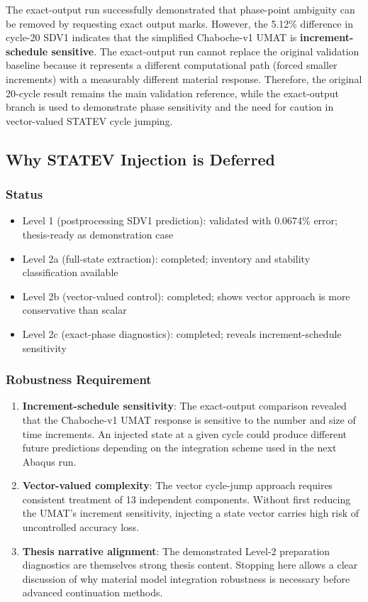 The exact-output run successfully demonstrated that phase-point ambiguity can be removed by requesting exact output marks. However, the 5.12\% difference in cycle-20 SDV1 indicates that the simplified Chaboche-v1 UMAT is \textbf{increment-schedule sensitive}. The exact-output run cannot replace the original validation baseline because it represents a different computational path (forced smaller increments) with a measurably different material response. Therefore, the original 20-cycle result remains the main validation reference, while the exact-output branch is used to demonstrate phase sensitivity and the need for caution in vector-valued STATEV cycle jumping.

\subsection{Why STATEV Injection is Deferred}

\subsubsection{Status}
\begin{itemize}
  \item Level 1 (postprocessing SDV1 prediction): validated with 0.0674\% error; thesis-ready as demonstration case
  \item Level 2a (full-state extraction): completed; inventory and stability classification available
  \item Level 2b (vector-valued control): completed; shows vector approach is more conservative than scalar
  \item Level 2c (exact-phase diagnostics): completed; reveals increment-schedule sensitivity
\end{itemize}

\subsubsection{Robustness Requirement}

\begin{enumerate}
  \item \textbf{Increment-schedule sensitivity}: The exact-output comparison revealed that the Chaboche-v1 UMAT response is sensitive to the number and size of time increments. An injected state at a given cycle could produce different future predictions depending on the integration scheme used in the next Abaqus run.
  
  \item \textbf{Vector-valued complexity}: The vector cycle-jump approach requires consistent treatment of 13 independent components. Without first reducing the UMAT's increment sensitivity, injecting a state vector carries high risk of uncontrolled accuracy loss.
  
  \item \textbf{Thesis narrative alignment}: The demonstrated Level-2 preparation diagnostics are themselves strong thesis content. Stopping here allows a clear discussion of why material model integration robustness is necessary before advanced continuation methods.
\end{enumerate}

